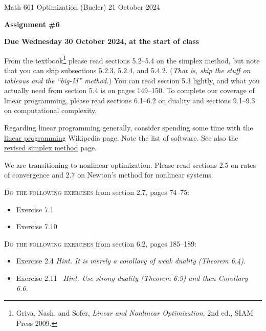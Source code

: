\documentclass[12pt]{amsart}
\begin{document}
\scriptsize \noindent Math 661 Optimization (Bueler) \hfill 21 October 2024
\normalsize

\medskip\bigskip

\Large\centerline{\textbf{Assignment \#6}}
\large
\bigskip

\centerline{\textbf{Due Wednesday 30 October 2024, at the start of class}}
\bigskip
\normalsize

\thispagestyle{empty}

\bigskip
\noindent From the textbook\footnote{Griva, Nash, and Sofer, \emph{Linear and Nonlinear Optimization}, 2nd ed., SIAM Press 2009.} please read sections 5.2--5.4 on the simplex method, but note that you can skip subsections 5.2.3, 5.2.4, and 5.4.2.  (\emph{That is, skip the stuff on tableaus and the ``big-M'' method.})  You can read section 5.3 lightly, and what you actually need from section 5.4 is on pages 149--150.  To complete our coverage of linear programming, please read sections 6.1--6.2 on duality and sections 9.1--9.3 on computational complexity.

\medskip \noindent Regarding linear programming generally, consider spending some time with the \href{https://en.wikipedia.org/wiki/Linear_programming}{linear programming} Wikipedia page.  Note the list of software.  See also the \href{https://en.wikipedia.org/wiki/Revised_simplex_method}{revised simplex method} page.

\medskip \noindent We are transitioning to nonlinear optimization.  Please read sections 2.5 on rates of convergence and 2.7 on Newton's method for nonlinear systems.

\bigskip
\noindent \textsc{Do the following exercises} from section 2.7, pages 74--75:

\begin{itemize}
\item Exercise 7.1
\item Exercise 7.10
\end{itemize}

\bigskip
\noindent \textsc{Do the following exercises} from section 6.2, pages 185--189:

\begin{itemize}
\item Exercise 2.4 \quad \emph{Hint.  It is merely a corollary of weak duality (Theorem 6.4).}
\item Exercise 2.11 \, \emph{Hint.  Use strong duality (Theorem 6.9) and then Corollary 6.6.}
\end{itemize}
\end{document}
